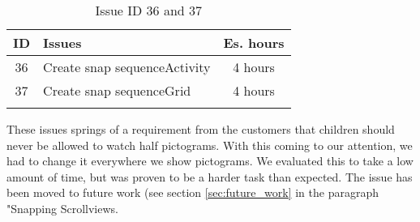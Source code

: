 \begin{longtable} { | c | p{12cm} | c | } 
\hline
	ID 	&	Issues	&		 Es. hours \\\hline
	36 	&	Create snap sequenceActivity	&	4 hours \\\hline
	37 	&	Create snap sequenceGrid		&	4 hours \\\hline
\caption{Issue ID 36 and 37}
\label{tab:spr3_Snapping}
\end{longtable}
These issues springs of a requirement from the customers that children should never be allowed to watch half pictograms. With this coming to our attention, we had to change it everywhere we show pictograms. We evaluated this to take a low amount of time, but was proven to be a harder task than expected. The issue has been moved to future work (see section \ref{sec:future_work} in the paragraph "Snapping Scrollviews.